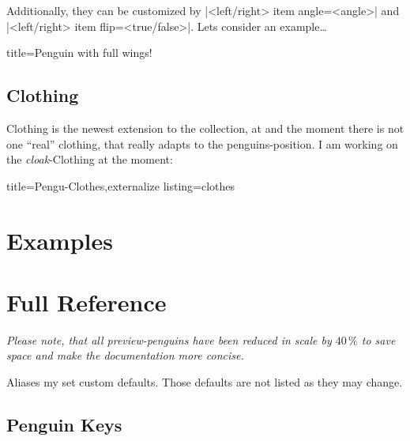 \documentclass[parskip=half,english,numbers=noenddot,footnotes=nomultiple,oneside]{scrartcl}
\let\say\enquote
\def\lstfnsize{-.7}
\begin{document}
Additionally, they can be customized by |<left/right> item angle=<angle>| and |<left/right> item flip=<true/false>|.
Lets consider an example\ldots
\begin{tcblisting}{title={Penguin with full wings!}}
\begin{tikzpicture}[scale=.75]
	\pingu[lightsaber right=orange,
	  lollipop left,
	  right item angle=70,
	  right wing raise, left wing grab]
	\pingu[cane left, right item flip,
	  sign post right={Hi!}, xshift=35mm]
\end{tikzpicture}
\end{tcblisting}

\subsection{Clothing}
Clothing is the newest extension to the collection, at and the moment there is not one \say{real} clothing, that really adapts to the penguins-position.
I am working on the \textit{cloak}-Clothing at the moment:
\begin{tcblisting}{title={Pengu-Clothes},externalize listing=clothes}
\begin{tikzpicture}[scale=.75]
	\pingu[cloak]
\end{tikzpicture}
\end{tcblisting}

\section{Examples}

\appendix
\section{Full Reference}\label{sec:full-ref}

\begin{center}
	\textit{Please note, that all preview-penguins have been reduced in scale by \(40\,\%\) to save space and make the documentation more concise.}
\end{center}

Aliases my set custom defaults. Those defaults are not listed as they may change.

\def\lstfnsize{-1.65}

\subsection{Penguin Keys}
\end{document}

